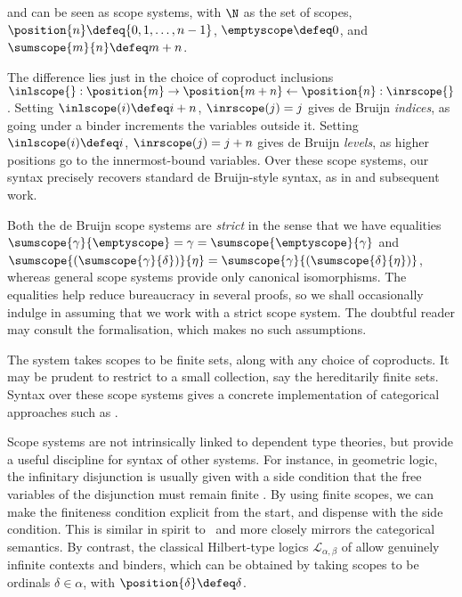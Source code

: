 \begin{example} \label{ex:de-bruijn-scope-systems}
   and  can be seen as scope systems, with $\N$ as the set of scopes, $\position{n} \defeq \{0, 1, \ldots, n-1\}$, $\emptyscope \defeq 0$, and $\sumscope{m}{n} \defeq m + n$.

  The difference lies just in the choice of coproduct inclusions $\inlscope{} : \position{m} \to \position{m + n} \leftarrow \position{n} : \inrscope{}$.
  Setting $\inlscope(i) \defeq i + n$, $\inrscope(j) = j$ gives de Bruijn \emph{indices}, as going under a binder increments the variables outside it.
  Setting $\inlscope(i) \defeq i$, $\inrscope(j) = j + n$ gives de Bruijn \emph{levels}, as higher positions go to the innermost-bound variables.
  Over these scope systems, our syntax precisely recovers standard de Bruijn-style syntax, as in \citep{deBruijn:Lambda:1972} and subsequent work.
\end{example}

Both the de Bruijn scope systems are \emph{strict} in the sense that we have equalities $\sumscope{\gamma}{\emptyscope} = \gamma = \sumscope{\emptyscope}{\gamma}$ and $\sumscope{(\sumscope{\gamma}{\delta})}{\eta} = \sumscope{\gamma}{(\sumscope{\delta}{\eta})}$, whereas general scope systems provide only canonical isomorphisms.
%
The equalities help reduce bureaucracy in several proofs, so we shall occasionally indulge in assuming that we work with a strict scope system.
%
The doubtful reader may consult the formalisation, which makes no such assumptions.
%

\begin{example}
  The  system takes scopes to be finite sets, along with any choice of coproducts.
  It may be prudent to restrict to a small collection, say the hereditarily finite sets.
  Syntax over these scope systems gives a concrete implementation of categorical approaches such as \citep{fiore-plotkin-turi}.
\end{example}

\begin{example}
  Scope systems are not intrinsically linked to dependent type theories, but provide a useful discipline for syntax of other systems.
  For instance, in geometric logic, the infinitary disjunction is usually given with a side condition that the free variables of the disjunction must remain finite \cite[D1.1.3(xi)]{johnstone:elephant-ii}.
  By using finite scopes, we can make the finiteness condition explicit from the start, and dispense with the side condition.
  This is similar in spirit to~\citep{fiore-plotkin-turi} and more closely mirrors the categorical semantics.
  By contrast, the classical Hilbert-type logics $\mathcal{L}_{\alpha,\beta}$ of \citep{karp:1964-book} allow genuinely infinite contexts and binders, which can be obtained by taking scopes to be ordinals $\delta \in \alpha$, with $\position{\delta} \defeq \delta$.
\end{example}

